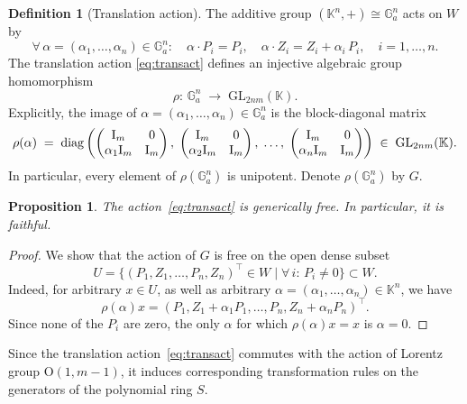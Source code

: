 \documentclass[12pt,a4paper]{extarticle}
\newtheorem{proposition}[theorem]{Proposition}
\theoremstyle{definition}
\newtheorem{definition}[theorem]{Definition}
\newcommand{\K}{\mathbb{K}}
\begin{document}
\begin{definition}[Translation action]\label{def:transact}
The additive group
$(\K^n,+) \cong \mathbb{G}_a^n$
acts on $W$ by
\begin{equation}\label{eq:transact}
 \forall \,  \alpha = (\alpha_1,\ldots,\alpha_n) \in \mathbb{G}_a^n\colon
  \quad
 \alpha \cdot P_i = P_i,
  \quad
  \alpha \cdot Z_i = Z_i + \alpha_i\,P_i,
  \quad i=1,\ldots,n.
\end{equation}
The translation action \eqref{eq:transact} defines an injective
algebraic group homomorphism
\[
  \rho \colon \,  \mathbb{G}_a^n \;\rightarrow\; \mathrm{GL}_{2nm}(\K).
\]
Explicitly,
the image of $\alpha = (\alpha_1,\ldots,\alpha_n) \in \mathbb{G}_a^n$ is the
block-diagonal matrix
\begin{equation*}\label{eq:rho}
  \rho(\alpha)
  \;=\;
  \operatorname{diag}\left(
    \begin{pmatrix} {\rm I}_m & 0 \\ \alpha_1 {\rm I}_m & {\rm I}_m \end{pmatrix},\;
    \begin{pmatrix} {\rm I}_m & 0 \\ \alpha_2 {\rm I}_m & {\rm I}_m \end{pmatrix},\;
    \ldots,\;
    \begin{pmatrix} {\rm I}_m & 0 \\ \alpha_n {\rm I}_m & {\rm I}_m \end{pmatrix}
  \right)
  \;\in\;\mathrm{GL}_{2nm}(\K).
\end{equation*}
  In
particular, every element of $\rho(\mathbb{G}_a^n)$ is unipotent. Denote $\rho(\mathbb{G}_a^n)$ by $G$.
\end{definition}
\begin{proposition}\label{prop: freeaction} 
The action~\eqref{eq:transact} is generically free.
   In particular, it is faithful.
\end{proposition}
\begin{proof}
We show that the action of $G$ is free on the open dense subset
\[
  U = \{(P_1,Z_1,\ldots,P_n,Z_n)^{\top}\in W \mid \forall\,i : \, P_i \neq 0\} \subset W.
\]
Indeed, for arbitrary $x\in U$, as well as arbitrary $\alpha=(\alpha_1,\ldots,\alpha_n)\in\mathbb{K}^n$, we have 
    \begin{equation*}
        \rho(\alpha)x=(P_1,Z_1+\alpha_1P_1,\ldots,P_n,Z_n+\alpha_nP_n)^{\top}.
    \end{equation*}
    Since none of the $P_i$ are zero, the only $\alpha$ for which $\rho(\alpha)x=x$ is $\alpha=0$.
\end{proof}
Since the translation action~\eqref{eq:transact} commutes with the action of Lorentz group $\mathrm{O}(1, m{-}1)$, it induces corresponding transformation rules on the generators of the polynomial ring $S$.
\end{document}
